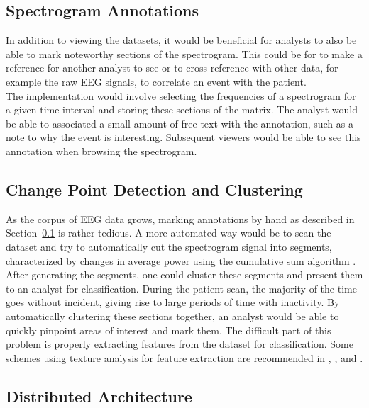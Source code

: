 \subsection{Spectrogram Annotations}\label{discuss-ch:annotations}

In addition to viewing the datasets, it would be beneficial for analysts to
also be able to mark noteworthy sections of the spectrogram. This could be for
to make a reference for another analyst to see or to cross reference with other
data, for example the raw EEG signals, to correlate an event with the patient. \\

The implementation would involve selecting the frequencies of a spectrogram for
a given time interval and storing these sections of the matrix.  The analyst
would be able to associated a small amount of free text with the annotation,
such as a note to why the event is interesting. Subsequent viewers would be
able to see this annotation when browsing the spectrogram.

\subsection{Change Point Detection and Clustering}\label{discuss-ch:cpd}

As the corpus of EEG data grows, marking annotations by hand as described in
Section~\ref{discuss-ch:annotations} is rather tedious.  A more automated way
would be to scan the dataset and try to automatically cut the spectrogram signal
into segments, characterized by changes in average power using the cumulative
sum algorithm \cite{cumsum}. After generating the segments, one could cluster these
segments and present them to an analyst for classification. During the patient
scan, the majority of the time goes without incident, giving rise to large
periods of time with inactivity. By automatically clustering these sections
together, an analyst would be able to quickly pinpoint areas of interest and
mark them. The difficult part of this problem is properly extracting features
from the dataset for classification. Some schemes using texture analysis for
feature extraction are recommended in \cite{texture-classification1},
\cite{texture-classification2}, and \cite{auto-segment}. \\

\subsection{Distributed Architecture}\label{discuss-ch:dist-arch}

